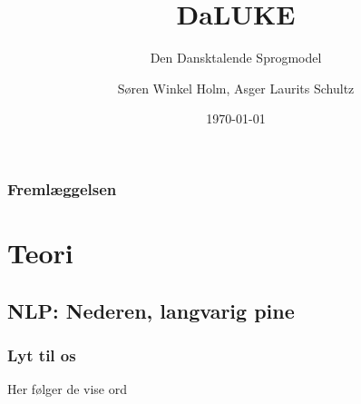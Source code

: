 \documentclass{beamer}
\title{DaLUKE}
\subtitle{
    Den Dansktalende Sprogmodel
}
\author[Søren Holm, Asger Schultz]{Søren Winkel Holm, Asger Laurits Schultz}
\institute[DTU]{Danmarks Tekniske Universitet}
\date{\today}
\begin{document}
\begin{frame}
    \titlepage
\end{frame}

\begin{frame}
    \frametitle{Fremlæggelsen}
    \tableofcontents
\end{frame}

\section{Teori}
\subsection{NLP: Nederen, langvarig pine}

\begin{frame}
    \frametitle{Lyt til os}
    Her følger de vise ord
\end{frame}
\end{document}
